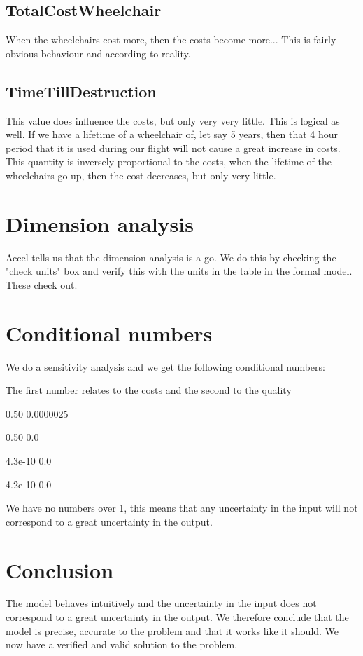 \documentclass[a4paper, 11pt, notitlepage]{report}
\begin{document}
	\subsection{TotalCostWheelchair} When the wheelchairs cost more, then the costs become more... This is fairly obvious behaviour and according to reality.
	\subsection{TimeTillDestruction} This value does influence the costs, but only very very little. This is logical as well. If we have a lifetime of a wheelchair of, let say 5 years, then that 4 hour period that it is used during our flight will not cause a great increase in costs. This quantity is inversely proportional to the costs, when the lifetime of the wheelchairs go up, then the cost decreases, but only very little.
	
\section{Dimension analysis} Accel tells us that the dimension analysis is a go. We do this by checking the "check units" box and verify this with the units in the table in the formal model. These check out.

\section{Conditional numbers} We do a sensitivity analysis and we get the following conditional numbers:
\begin{description}
\item The first number relates to the costs and the second to the quality
	\item [Vescort]	0.50	0.0000025
	\item [WheelchairsPerMaintainer]		0.50	0.0
	\item [TotalCostWheelchair]		4.3e-10	0.0
	\item [TimeTillDestructionPerYear]		4.2e-10	0.0
	\end{description}
	We have no numbers over 1, this means that any uncertainty in the input will not correspond to a great uncertainty in the output.
	
\section{Conclusion} The model behaves intuitively and the uncertainty in the input does not correspond to a great uncertainty in the output. We therefore conclude that the model is precise, accurate to the problem and that it works like it should. We now have a verified and valid solution to the problem.
\end{document}
